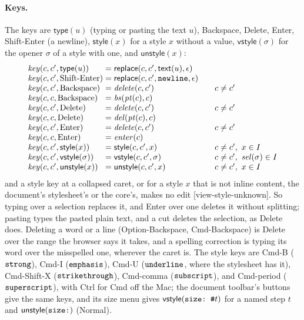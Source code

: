 \documentclass[11pt]{article}
\numberwithin{equation}{section}
\newcommand{\kw}[1]{\ensuremath{\mathsf{#1}}}
\newcommand{\str}[1]{\ensuremath{\text{\texttt{#1}}}}
\begin{document}
\paragraph{Keys.}  The keys are
$\kw{type}(u)$ (typing or pasting the text $u$), Backspace, Delete, Enter,
Shift-Enter (a newline), $\kw{style}(x)$ for a style $x$ without a value,
$\kw{vstyle}(\sigma)$ for the opener $\sigma$ of a style with one, and
$\kw{unstyle}(x)$:
\begin{equation}\label{eq:view-keys}
\begin{array}{@{}l@{\;=\;}l@{\qquad}l@{}}
\mathit{key}(c, c', \kw{type}(u)) & \kw{replace}(c, c', \kw{text}(u), \epsilon) \\
\mathit{key}(c, c', \text{Shift-Enter}) & \kw{replace}(c, c', \str{newline}, \epsilon) \\
\mathit{key}(c, c', \text{Backspace}) & \mathit{delete}(c, c') & c \ne c' \\
\mathit{key}(c, c, \text{Backspace}) & \mathit{bs}(\mathit{pt}(c), c) \\
\mathit{key}(c, c', \text{Delete}) & \mathit{delete}(c, c') & c \ne c' \\
\mathit{key}(c, c, \text{Delete}) & \mathit{del}(\mathit{pt}(c), c) \\
\mathit{key}(c, c', \text{Enter}) & \mathit{delete}(c, c') & c \ne c' \\
\mathit{key}(c, c, \text{Enter}) & \mathit{enter}(c) \\
\mathit{key}(c, c', \kw{style}(x)) & \kw{style}(c, c', x) & c \ne c',\ x \in I \\
\mathit{key}(c, c', \kw{vstyle}(\sigma)) & \kw{vstyle}(c, c', \sigma) & c \ne c',\ \mathit{sel}(\sigma) \in I \\
\mathit{key}(c, c', \kw{unstyle}(x)) & \kw{unstyle}(c, c', x) & c \ne c',\ x \in I
\end{array}
\end{equation}
and a style key at a collapsed caret, or for a style $x$ that is not inline
content, the document's stylesheet's or the core's, makes no edit
[view-style-unknown].  So typing over a
selection replaces it, and Enter over one deletes it without splitting;
pasting types the pasted plain text, and a cut deletes the selection, as
Delete does.  Deleting a word or a line (Option-Backspace, Cmd-Backspace)
is Delete over the range the browser says it takes, and a spelling
correction is typing its word over the misspelled one, wherever the caret
is.  The
style keys are Cmd-B ($\str{strong}$), Cmd-I ($\str{emphasis}$), Cmd-U
($\str{underline}$, where the stylesheet has it), Cmd-Shift-X ($\str{strikethrough}$), Cmd-comma
($\str{subscript}$), and Cmd-period ($\str{superscript}$), with Ctrl for
Cmd off the Mac; the document toolbar's buttons give the same keys, and its
size menu gives $\kw{vstyle}(\str{size:\ \#}t)$ for a named step $t$ and
$\kw{unstyle}(\str{size:})$ (Normal).
\end{document}
